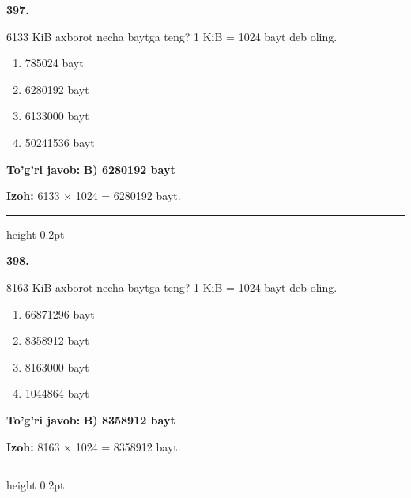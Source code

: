 \documentclass[10pt,a4paper,oneside]{article}
\begin{document}
\noindent\textbf{\color{ink}397.}
\par
6133 KiB axborot necha baytga teng? 1 KiB = 1024 bayt deb oling.
\begin{enumerate}[label=\Alph*),leftmargin=9mm]
\item 785024 bayt
\item 6280192 bayt
\item 6133000 bayt
\item 50241536 bayt
\end{enumerate}
\begin{tcolorbox}[enhanced,breakable,colback=teal!4,colframe=teal!50!black,boxrule=0.5pt,arc=1.1mm,left=3mm,right=3mm,top=1.7mm,bottom=1.7mm,before skip=2mm,after skip=2mm]
\textbf{\color{teal}To'g'ri javob:} \textbf{B) 6280192 bayt}
\par\smallskip
\textbf{Izoh:} 6133 \ensuremath{\times} 1024 = 6280192 bayt.
\end{tcolorbox}
\vspace{2mm}\hrule height 0.2pt \vspace{3mm}

\noindent\textbf{\color{ink}398.}
\par
8163 KiB axborot necha baytga teng? 1 KiB = 1024 bayt deb oling.
\begin{enumerate}[label=\Alph*),leftmargin=9mm]
\item 66871296 bayt
\item 8358912 bayt
\item 8163000 bayt
\item 1044864 bayt
\end{enumerate}
\begin{tcolorbox}[enhanced,breakable,colback=teal!4,colframe=teal!50!black,boxrule=0.5pt,arc=1.1mm,left=3mm,right=3mm,top=1.7mm,bottom=1.7mm,before skip=2mm,after skip=2mm]
\textbf{\color{teal}To'g'ri javob:} \textbf{B) 8358912 bayt}
\par\smallskip
\textbf{Izoh:} 8163 \ensuremath{\times} 1024 = 8358912 bayt.
\end{tcolorbox}
\vspace{2mm}\hrule height 0.2pt \vspace{3mm}
\end{document}
